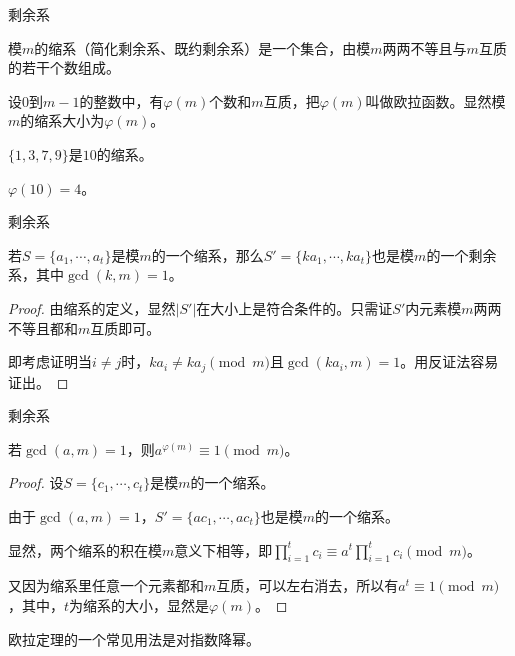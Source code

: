 \documentclass{ctexbeamer}        %
\begin{document}
\begin{frame}{剩余系}

\begin{definition}[缩系]
    模$m$的缩系（简化剩余系、既约剩余系）是一个集合，由模$m$两两不等且与$m$互质的若干个数组成。
\end{definition}

\begin{definition}[欧拉函数]
    设$0$到$m-1$的整数中，有$\varphi(m)$个数和$m$互质，把$\varphi(m)$叫做欧拉函数。显然模$m$的缩系大小为$\varphi(m)$。
\end{definition}

\begin{example}
    $\lbrace 1,3,7,9 \rbrace$是$10$的缩系。

	$\varphi(10)=4$。
\end{example}

\end{frame}

\begin{frame}{剩余系}

\begin{theorem}[构造缩系]
    若$S=\lbrace a_1,\cdots,a_t \rbrace$是模$m$的一个缩系，那么$S'=\lbrace ka_1,\cdots,ka_t \rbrace$也是模$m$的一个剩余系，其中$\gcd(k,m)=1$。
\end{theorem}

\begin{proof}
	由缩系的定义，显然$|S'|$在大小上是符合条件的。只需证$S'$内元素模$m$两两不等且都和$m$互质即可。

	即考虑证明当$i \neq j$时，$ka_i \neq ka_j \pmod m$且$\gcd(ka_i,m)=1$。用反证法容易证出。
\end{proof}

\end{frame}

\begin{frame}{剩余系}

\begin{theorem}[欧拉定理]
    若$\gcd(a,m)=1$，则$a^{\varphi(m)}\equiv 1 \pmod m$。
\end{theorem}
\pause
\begin{proof}
	设$S=\lbrace c_1,\cdots,c_t \rbrace$是模$m$的一个缩系。

	由于$\gcd(a,m)=1$，$S'=\lbrace ac_1,\cdots,ac_t \rbrace$也是模$m$的一个缩系。

	显然，两个缩系的积在模$m$意义下相等，即$\prod_{i=1}^t c_i \equiv a^t \prod_{i=1}^t c_i \pmod m$。

	又因为缩系里任意一个元素都和$m$互质，可以左右消去，所以有$a^t \equiv 1 \pmod m$，其中，$t$为缩系的大小，显然是$\varphi(m)$。
\end{proof}

欧拉定理的一个常见用法是对指数降幂。

\end{frame}
\end{document}
